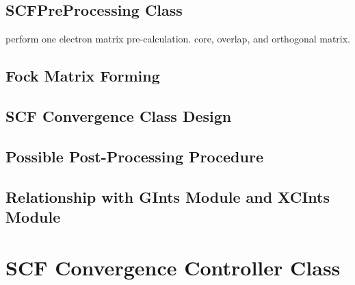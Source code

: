 \subsection{SCFPreProcessing Class}
%
%

perform one electron matrix pre-calculation.
core, overlap, and orthogonal matrix.

\subsection{Fock Matrix Forming}
%
%

\subsection{SCF Convergence Class Design}
%
%

\subsection{Possible Post-Processing Procedure}
%
%

\subsection{Relationship with GInts Module and XCInts Module}
%
%

\section{SCF Convergence Controller Class}
%
%






